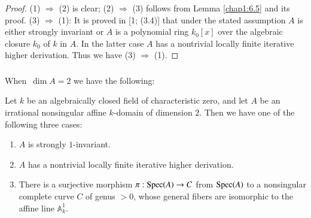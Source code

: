 \begin{proof}
(1) $\Longrightarrow$ (2) is clear; (2) $\Longrightarrow$ (3) follows
  from Lemma \ref{chap1:6.5} and its proof. (3) $\Longrightarrow$ (1): It
  is proved in [1; (3.4)] that under the stated assumption $A$ is
  either strongly invariant or $A$ is a polynomial ring $k_{0}[x]$
  over the algebraic closure $k_{0}$ of $k$ in $A$. In the latter case
  $A$ has a nontrivial locally finite iterative higher
  derivation. Thus we have (3) $\Longrightarrow$ (1).
\end{proof}

\subsubsection{}\label{chap1:6.6.2}
When\pageoriginale\ $\dim A=2$ we have the following:

\begin{prop*}
Let $k$ be an algebraically closed field of characteristic zero, and
let $A$ be an irrational nonsingular affine $k$-domain of dimension
$2$. Then we have one of the following three cases:
\begin{enumerate}
\renewcommand{\labelenumi}{\rm(\theenumi)}
\item $A$ is strongly $1$-invariant.

\item $A$ has a nontrivial locally finite iterative higher derivation.

\item There is a surjective morphism $\pi:\operatorname{Spec}(A)\to C$ from
  $\operatorname{Spec}(A)$ to a nonsingular complete curve $C$ of genus $>0$, whose
  general fibers are isomorphic to the affine line $\mathbb{A}^{1}_{k}$.
\end{enumerate}
\end{prop*}

